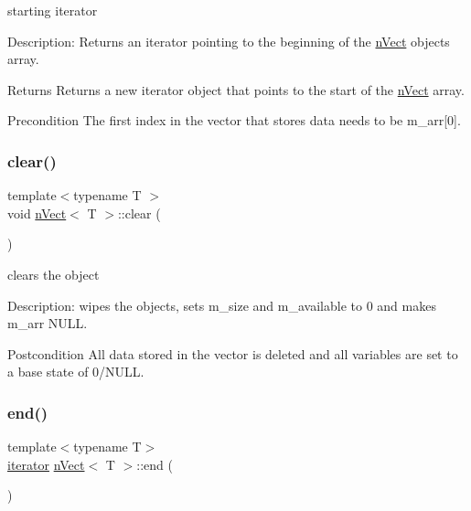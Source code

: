 starting iterator 

Description\+: Returns an iterator pointing to the beginning of the \hyperlink{classnVect}{n\+Vect} object\textquotesingle{}s array. \begin{DoxyReturn}{Returns}
Returns a new iterator object that points to the start of the \hyperlink{classnVect}{n\+Vect} array. 
\end{DoxyReturn}
\begin{DoxyPrecond}{Precondition}
The first index in the vector that stores data needs to be m\+\_\+arr\mbox{[}0\mbox{]}. 
\end{DoxyPrecond}
\mbox{\label{classnVect_ad83c522fff7a545b02d20dbf2e99a4e7}} 
\subsubsection{\texorpdfstring{clear()}{clear()}}
{\footnotesize\ttfamily template$<$typename T $>$ \\
void \hyperlink{classnVect}{n\+Vect}$<$ T $>$\+::clear (\begin{DoxyParamCaption}{ }\end{DoxyParamCaption})}



clears the object 

Description\+: wipes the objects, sets m\+\_\+size and m\+\_\+available to 0 and makes m\+\_\+arr N\+U\+LL. \begin{DoxyPostcond}{Postcondition}
All data stored in the vector is deleted and all variables are set to a base state of 0/\+N\+U\+LL. 
\end{DoxyPostcond}
\mbox{\label{classnVect_a44a13c3cb3ede92ae23298920b1d88bf}} 
\subsubsection{\texorpdfstring{end()}{end()}}
{\footnotesize\ttfamily template$<$typename T$>$ \\
\hyperlink{classnVect_1_1iterator}{iterator} \hyperlink{classnVect}{n\+Vect}$<$ T $>$\+::end (\begin{DoxyParamCaption}{ }\end{DoxyParamCaption})\hspace{0.3cm}{\ttfamily [inline]}}



